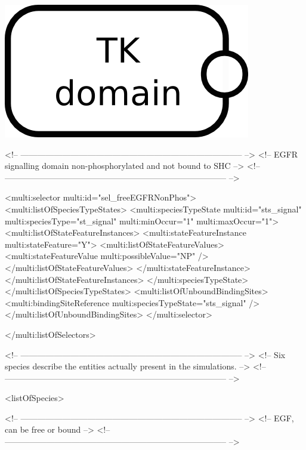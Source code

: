\includegraphics{figs/pngs/sel_freeEGFRNonPhos.png}

\begin{example}
<!-- -------------------------------------------------------------------------------- -->
<!-- EGFR signalling domain non-phosphorylated and not bound to SHC                   --> 
<!-- -------------------------------------------------------------------------------- -->

      <multi:selector multi:id="sel_freeEGFRNonPhos">
        <multi:listOfSpeciesTypeStates>
          <multi:speciesTypeState multi:id="sts_signal" multi:speciesType="st_signal" 
                                   multi:minOccur="1" multi:maxOccur="1">
            <multi:listOfStateFeatureInstances>
              <multi:stateFeatureInstance multi:stateFeature="Y">
                <multi:listOfStateFeatureValues>
                  <multi:stateFeatureValue multi:possibleValue="NP" />
                </multi:listOfStateFeatureValues>
              </multi:stateFeatureInstance>
            </multi:listOfStateFeatureInstances>
          </multi:speciesTypeState>
        </multi:listOfSpeciesTypeStates>
        <multi:listOfUnboundBindingSites>
          <multi:bindingSiteReference multi:speciesTypeState="sts_signal" />
        </multi:listOfUnboundBindingSites>
      </multi:selector>

   </multi:listOfSelectors>

<!-- -------------------------------------------------------------------------------- -->
<!-- Six species describe the entities actually present in the simulations.           -->
<!-- -------------------------------------------------------------------------------- -->

    <listOfSpecies>

<!-- -------------------------------------------------------------------------------- -->
<!-- EGF, can be free or bound                                                        -->
<!-- -------------------------------------------------------------------------------- -->


\end{example}

